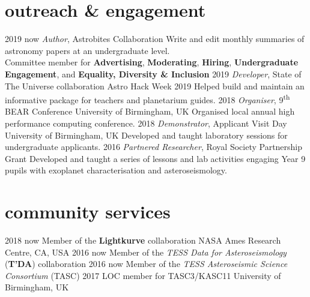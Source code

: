 \documentclass[letterpaper]{k-cv} %
\begin{document}
\section{\color{c3}outreach \& engagement}
\begin{entrylist}
	\centry
	{2019 \to now}
	{\emph{Author}, Astrobites Collaboration}
	{}
	{Write and edit monthly summaries of astronomy papers at an undergraduate level. \\ Committee member for \textbf{\textcolor{c3}{Advertising}}, \textbf{\textcolor{c3}{Moderating}}, \textbf{\textcolor{c3}{Hiring}}, \textbf{\textcolor{c3}{Undergraduate Engagement}}, and \textbf{\textcolor{c3}{Equality, Diversity \& Inclusion}}}
	\centry
	{2019}
	{\emph{Developer}, State of The Universe collaboration}
	{Astro Hack Week 2019}
	{Helped build and maintain an informative package for teachers and planetarium guides.}
	\centry
	{2018 }
	{\emph{Organiser}, 9\textsuperscript{th} BEAR Conference}
	{University of Birmingham, UK}
	{Organised local annual high performance computing conference.}
	\centry
	{2018 }
	{\emph{Demonstrator}, Applicant Visit Day}
	{University of Birmingham, UK}
	{Developed and taught laboratory sessions for undergraduate applicants.}
	\centry
	{2016 }
	{\emph{Partnered Researcher}, \textcolor{c3}{Royal Society Partnership Grant}}
	{}
	{Developed and taught a series of lessons and lab activities engaging Year 9 pupils with exoplanet characterisation and asteroseismology.}
\end{entrylist}

\clearpage
{}

\section{\color{c4}community services}
\begin{entrylist}
	\centrythree
	{2018 \to now}
	{Member of the \textbf{\textcolor{c4}{Lightkurve}} collaboration}
	{NASA Ames Research Centre, CA, USA}
	\centrythree
	{2016 \to now}
	{Member of the \emph{TESS Data for Asteroseismology} (\textbf{\textcolor{c4}{T'DA}}) collaboration }
	{}
	\centrythree
	{2016 \to now}
	{Member of the \emph{TESS Asteroseismic Science Consortium} (TASC)}
	{}
	\centrythree
	{2017}
	{LOC member for TASC3/KASC11}
	{University of Birmingham, UK}
\end{entrylist}
\end{document}
